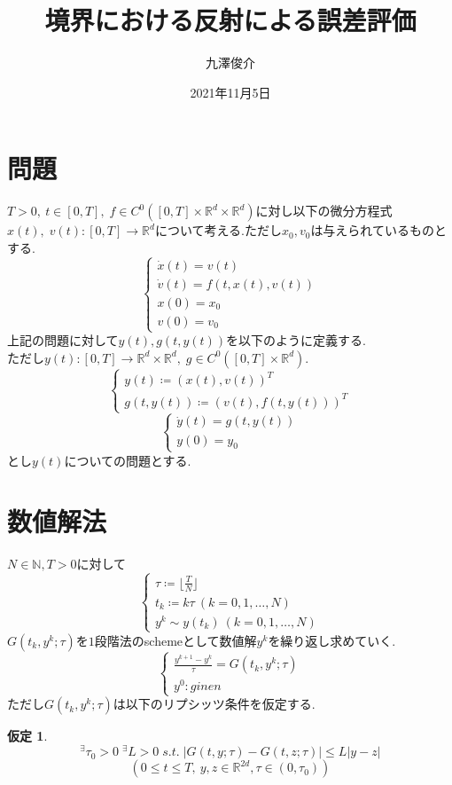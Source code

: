 \documentclass[a4,12pt]{article}
\title{境界における反射による誤差評価}
\author{九澤俊介}
\date{2021年11月5日}
\newtheorem{hyp}{仮定}
\begin{document}
\maketitle
\section{問題}
$T>0,\ t\in[0,T],\;f \in C^{0} ([0,T] \times \mathbb{R}^d \times \mathbb{R}^d )$に対し以下の微分方程式$x(t),\; v(t):[0,T]\rightarrow\mathbb{R}^d$について考える.ただし$x_0,v_0$は与えられているものとする.
\begin{equation}
\begin{cases}
\dot{x}(t)=v(t)\\
\dot{v}(t)=f(t,x(t),v(t))\\
x(0)=x_0\\
v(0)=v_0
\end{cases}
\end{equation}
上記の問題に対して$y(t),g(t,y(t))$を以下のように定義する.\\ただし$y(t):[0,T]\rightarrow\mathbb{R}^d\times\mathbb{R}^d,\;g\in C^0([0,T]\times\mathbb{R}^d)$.
\begin{equation}
\begin{cases}
y(t)\coloneqq (x(t),v(t))^T\\
g(t,y(t))\coloneqq (v(t),f(t,y(t)))^T
\end{cases}
\end{equation}
\begin{equation}
\begin{cases}
\dot{y}(t)=g(t,y(t))\\
y(0)=y_0
\end{cases}
\end{equation}
とし$y(t)$についての問題とする.
\section{数値解法}
$N\in\mathbb{N},T>0$に対して
\begin{equation}
\begin{cases}
\tau\coloneqq \lfloor\frac{T}{N}\rfloor \\
t_k\coloneqq k\tau\ (k=0,1,\ldots ,N)\\
y^k\sim y(t_k) \ (k=0,1,\ldots ,N)
\end{cases}
\end{equation}
$G(t_k,y^k;\tau)$を$1$段階法のschemeとして数値解$y^k$を繰り返し求めていく.
\begin{equation}
\begin{cases}\displaystyle\frac{y^{k+1}-y^k}{\tau}=G(t_k,y^k;\tau)\\
y^0:ginen
\end{cases}
\end{equation}
ただし$G(t_k,y^k;\tau)$は以下のリプシッツ条件を仮定する.
\begin{hyp}
\label{lip}
\[{}^\exists\tau_0 > 0\; {}^\exists L>0\; s.t.\; |G(t,y;\tau)-G(t,z;\tau)|\leq L|y-z|\]
\[(0\leq t\leq T,\  y,z\in\mathbb{R}^{2d},\tau\in(0,\tau_0))\]
\end{hyp}
\end{document}
